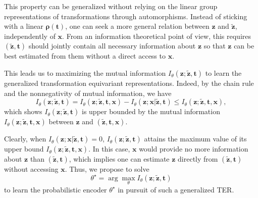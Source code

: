 \documentclass[10pt,journal,compsoc,twoside]{IEEEtran}
\begin{document}
This property can be generalized without relying on the linear group representations of transformations through automorphisms. Instead of sticking with a linear $\boldsymbol\rho(\mathbf t)$, one can seek a more general relation between $\mathbf z$ and $\mathbf {\tilde z}$, independently of $\mathbf x$.  From an information theoretical point of view, this requires $(\mathbf {\tilde z},\mathbf t)$ should jointly contain all necessary information about $\mathbf z$ so that $\mathbf z$ can be best estimated from them without a direct access to $\mathbf x$.


This leads us to maximizing the mutual information $I_\theta(\mathbf z;\mathbf {\tilde z},\mathbf t)$ to learn the generalized transformation equivariant representations. Indeed, by the chain rule and the nonnegativity of mutual information, we have
$$
I_\theta(\mathbf z;\mathbf {\tilde z},\mathbf t)= I_\theta(\mathbf z;\mathbf {\tilde z},\mathbf t, \mathbf x) - I_\theta(\mathbf z;\mathbf x|\mathbf {\tilde z},\mathbf t) \leq I_\theta(\mathbf z;\mathbf {\tilde z},\mathbf t, \mathbf x),
$$
which shows $I_\theta(\mathbf z;\mathbf {\tilde z},\mathbf t)$ is upper bounded by the mutual information $I_\theta(\mathbf z;\mathbf {\tilde z},\mathbf t, \mathbf x)$ between $\mathbf z$ and $(\mathbf {\tilde z},\mathbf t,\mathbf x)$.

Clearly, when $I_\theta(\mathbf z;\mathbf x|\mathbf {\tilde z},\mathbf t)=0$, $I_\theta(\mathbf z;\mathbf {\tilde z},\mathbf t)$ attains the maximum value of its upper bound $I_\theta(\mathbf z;\mathbf {\tilde z},\mathbf t, \mathbf x)$. In this case, $\mathbf x$ would provide no more information about $\mathbf z$ than $(\mathbf {\tilde z},\mathbf t)$, which implies one can estimate $\mathbf z$ directly from $(\mathbf {\tilde z},\mathbf t)$ without accessing $\mathbf x$.
Thus, we propose to solve
$$
\theta^\star = \arg\max_{\theta} I_\theta(\mathbf z;\mathbf {\tilde z},\mathbf t)
$$
to learn the probabilistic encoder $\theta^\star$ in pursuit of such a generalized TER.
\end{document}
